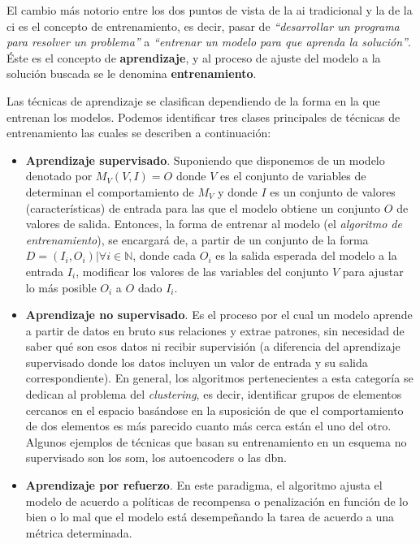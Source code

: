 El cambio más notorio entre los dos puntos de vista de la \gls{ai} tradicional y la de la \gls{ci} es el concepto de entrenamiento, es decir, pasar de \textit{\enquote{desarrollar un programa para resolver un problema}} a \textit{\enquote{entrenar un modelo para que aprenda la solución}}. Éste es el concepto de \textbf{aprendizaje}, y al proceso de ajuste del modelo a la solución buscada se le denomina \textbf{entrenamiento}.

Las técnicas de aprendizaje se clasifican dependiendo de la forma en la que entrenan los modelos. Podemos identificar tres clases principales de técnicas de entrenamiento las cuales se describen a continuación:

\begin{itemize}
	\item \textbf{Aprendizaje supervisado}. Suponiendo que disponemos de un modelo denotado por $M_V(V, I) = O$ donde $V$ es el conjunto de variables de determinan el comportamiento de $M_V$ y donde $I$ es un conjunto de valores (características) de entrada para las que el modelo obtiene un conjunto $O$ de valores de salida. Entonces, la forma de entrenar al modelo (el \textit{algoritmo de entrenamiento}), se encargará de, a partir de un conjunto de la forma $D = {(I_i, O_i) | \forall i \in \mathbb{N}}$, donde cada $O_i$ es la salida esperada del modelo a la entrada $I_i$, modificar los valores de las variables del conjunto $V$ para ajustar lo más posible $O_i$ a $O$ dado $I_i$.
	\item \textbf{Aprendizaje no supervisado}. Es el proceso por el cual un modelo aprende a partir de datos en bruto sus relaciones y extrae patrones, sin necesidad de saber qué son esos datos ni recibir supervisión (a diferencia del aprendizaje supervisado donde los datos incluyen un valor de entrada y su salida correspondiente). En general, los algoritmos pertenecientes a esta categoría se dedican al problema del \textit{clustering}, es decir, identificar grupos de elementos cercanos en el espacio basándose en la suposición de que el comportamiento de dos elementos es más parecido cuanto más cerca están el uno del otro. Algunos ejemplos de técnicas que basan su entrenamiento en un esquema no supervisado son los \gls{som}, los \glspl{autoencoder} o las \gls{dbn}.
	\item \textbf{Aprendizaje por refuerzo}. En este paradigma, el algoritmo ajusta el modelo de acuerdo a políticas de recompensa o penalización en función de lo bien o lo mal que el modelo está desempeñando la tarea de acuerdo a una métrica determinada. 
\end{itemize}

